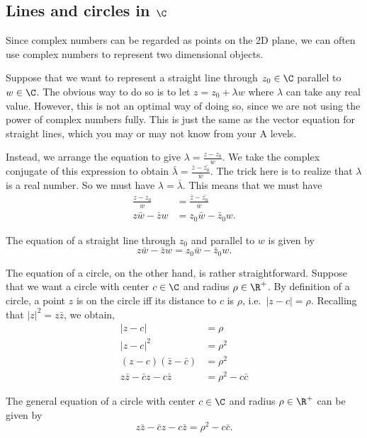 \documentclass[a4paper]{article}
\begin{document}
\subsection{Lines and circles in \texorpdfstring{$\C$}{C}}
Since complex numbers can be regarded as points on the 2D plane, we can often use complex numbers to represent two dimensional objects.

Suppose that we want to represent a straight line through $z_0 \in \C$ parallel to $w\in \C$. The obvious way to do so is to let $z = z_0 + \lambda w$ where $\lambda$ can take any real value. However, this is not an optimal way of doing so, since we are not using the power of complex numbers fully. This is just the same as the vector equation for straight lines, which you may or may not know from your A levels.

Instead, we arrange the equation to give $\lambda = \frac{z - z_0}{w}$. We take the complex conjugate of this expression to obtain $\bar{\lambda} = \frac{\bar{z} - \bar{z_0}}{\bar{w}}$. The trick here is to realize that $\lambda$ is a real number. So we must have $\lambda = \bar \lambda$. This means that we must have
\begin{align*}
  \frac{z - z_0}{w} &= \frac{\bar{z} - \bar{z_0}}{\bar{w}}\\
  z\bar w - \bar z w &= z_0 \bar w - \bar z_0 w.
\end{align*}

\begin{thm}
  The equation of a straight line through $z_0$ and parallel to $w$ is given by
  \[
    z\bar w - \bar z w = z_0 \bar w - \bar z_0 w.
  \]
\end{thm}

The equation of a circle, on the other hand, is rather straightforward. Suppose that we want a circle with center $c\in \C$ and radius $\rho \in \R^+$. By definition of a circle, a point $z$ is on the circle iff its distance to $c$ is $\rho$, i.e.\ $|z - c| = \rho$. Recalling that $|z|^2 = z\bar z$, we obtain,
\begin{align*}
  |z - c| &= \rho\\
  |z - c|^2 &= \rho^2\\
  (z - c)(\bar z - \bar c) &= \rho^2\\
  z\bar z - \bar c z - c\bar z &= \rho^2 - c\bar c
\end{align*}
\begin{thm}
  The general equation of a circle with center $c\in \C$ and radius $\rho \in \R^+$ can be given by
  \[
    z\bar z - \bar c z - c\bar z = \rho^2 - c\bar c.
  \]
\end{thm}
\end{document}
